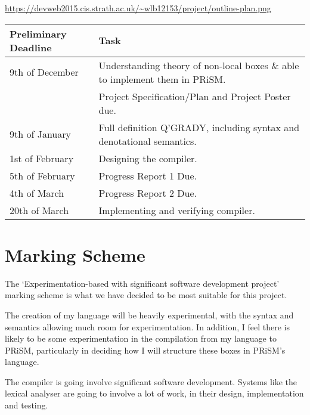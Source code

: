 \documentclass[11pt, a4paper]{article}
\begin{document}
\url{https://devweb2015.cis.strath.ac.uk/~wlb12153/project/outline-plan.png}

\begin{center}
    \begin{tabular}{l | p{7.5cm}}
        Preliminary Deadline & Task \\
        \hline
        9th of December & Understanding theory of non-local boxes \& able to
        implement them in PRiSM. \\

        & Project Specification/Plan and Project Poster due. \\

        9th of January & Full definition Q'GRADY, including syntax and
        denotational semantics. \\

        1st of February & Designing the compiler. \\

        5th of February & Progress Report 1 Due. \\

        4th of March & Progress Report 2 Due. \\

        20th of March & Implementing and verifying compiler. \\
\end{tabular}
\end{center}

\section{Marking Scheme} %
\label{sec:marking_scheme}
The `Experimentation-based with significant software development project'
marking scheme is what we have decided to be most suitable for this project.

The creation of my language will be heavily experimental, with the syntax and
semantics allowing much room for experimentation. In addition, I feel there is
likely to be some experimentation in the compilation from my language to PRiSM,
particularly in deciding how I will structure these boxes in PRiSM's language.

The compiler is going involve significant software development. Systems like the
lexical analyser are going to involve a lot of work, in their design,
implementation and testing. 

\newpage
\printbibliography{}
\end{document}
